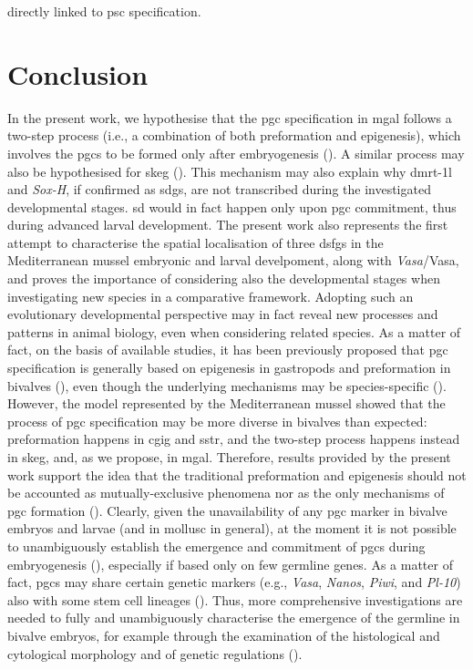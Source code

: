 directly linked to \gls{psc} specification.

\section{Conclusion}\label{chapter:insitu-conclusions}
In the present work, we hypothesise that the \gls{pgc} specification in \gls{mgal} follows a two-step process (i.e., a combination of both preformation and epigenesis), which involves the \glspl{pgc} to be formed only after embryogenesis (). A similar process may also be hypothesised for \gls{skeg} (). This mechanism may also explain why \gls{dmrt-1l} and \textit{Sox-H}, if confirmed as \glspl{sdg}, are not transcribed during the investigated developmental stages. \gls{sd} would in fact happen only upon \gls{pgc} commitment, thus during advanced larval development. The present work also represents the first attempt to characterise the spatial localisation of three \glspl{dsfg} in the Mediterranean mussel embryonic and larval develpoment, along with \textit{Vasa}/Vasa, and proves the importance of considering also the developmental stages when investigating new species in a comparative framework. Adopting such an evolutionary developmental perspective may in fact reveal new processes and patterns in animal biology, even when considering related species. As a matter of fact, on the basis of available studies, it has been previously proposed that \gls{pgc} specification is generally based on epigenesis in gastropods and preformation in bivalves (), even though the underlying mechanisms may be species-specific (). However, the model represented by the Mediterranean mussel showed that the process of \gls{pgc} specification may be more diverse in bivalves than expected: preformation happens in \gls{cgig} and \gls{sstr}, and the two-step process happens instead in \gls{skeg}, and, as we propose, in \gls{mgal}. Therefore, results provided by the present work support the idea that the traditional preformation and epigenesis should not be accounted as mutually-exclusive phenomena nor as the only mechanisms of \gls{pgc} formation (). Clearly, given the unavailability of any \gls{pgc} marker in bivalve embryos and larvae (and in mollusc in general), at the moment it is not possible to unambiguously establish the emergence and commitment of \glspl{pgc} during embryogenesis (), especially if based only on few germline genes. As a matter of fact, \glspl{pgc} may share certain genetic markers (e.g., \textit{Vasa}, \textit{Nanos}, \textit{Piwi}, and \textit{Pl-10}) also with some stem cell lineages (). Thus, more comprehensive investigations are needed to fully and unambiguously characterise the emergence of the germline in bivalve embryos, for example through the examination of the histological and cytological morphology and of genetic regulations (). 